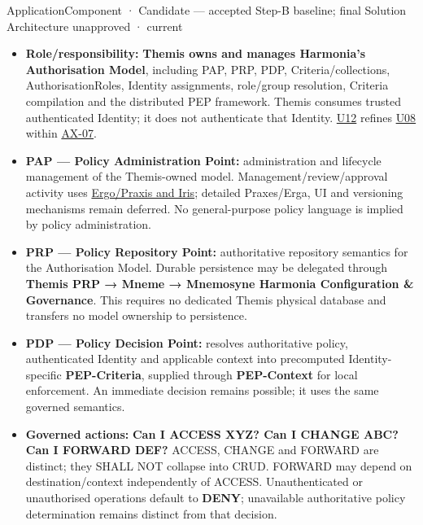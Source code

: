 \label{element:899d34ec491948b68aad09e507dea6d1}
{\small ApplicationComponent · Candidate — accepted Step-B baseline; final Solution Architecture unapproved · current}\par

\begin{itemize}


\item \textbf{Role/responsibility:} \textbf{Themis owns and manages Harmonia's Authorisation
  Model}, including PAP, PRP, PDP, Criteria/collections, AuthorisationRoles,
  Identity assignments, role/group resolution, Criteria compilation and the
  distributed PEP framework. Themis consumes trusted authenticated Identity;
  it does not authenticate that Identity. \href{\detokenize{../../../../../docs/markdown/05-information-systems-architecture/sources.md#u12}}{U12} refines
  \href{\detokenize{../../../../../docs/markdown/05-information-systems-architecture/sources.md#u08}}{U08} within \hyperref[element:5de2ae2c3b794c2d9f3a14efd51d564f]{AX-07}.

\item \textbf{PAP — Policy Administration Point:} administration and lifecycle management
  of the Themis-owned model. Management/review/approval activity uses
  \href{\detokenize{../../../../../docs/markdown/05-information-systems-architecture/component-register.md#authorisation-administration}}{Ergo/Praxis and Iris}; detailed Praxes/Erga,
  UI and versioning mechanisms remain deferred. No general-purpose policy
  language is implied by policy administration.

\item \textbf{PRP — Policy Repository Point:} authoritative repository semantics for the
  Authorisation Model. Durable persistence may be delegated through \textbf{Themis PRP
  → Mneme → Mnemosyne Harmonia Configuration \& Governance}. This requires no
  dedicated Themis physical database and transfers no model ownership to persistence.

\item \textbf{PDP — Policy Decision Point:} resolves authoritative policy, authenticated
  Identity and applicable context into precomputed Identity-specific
  \textbf{PEP-Criteria}, supplied through \textbf{PEP-Context} for local enforcement.
  An immediate decision remains possible; it uses the same governed semantics.

\item \textbf{Governed actions:} \textbf{Can I ACCESS XYZ? Can I CHANGE ABC? Can I FORWARD DEF?}
  ACCESS, CHANGE and FORWARD are distinct; they SHALL NOT collapse into CRUD.
  FORWARD may depend on destination/context independently of ACCESS.
  Unauthenticated or unauthorised operations default to \textbf{DENY}; unavailable
  authoritative policy determination remains distinct from that decision.

\end{itemize}






